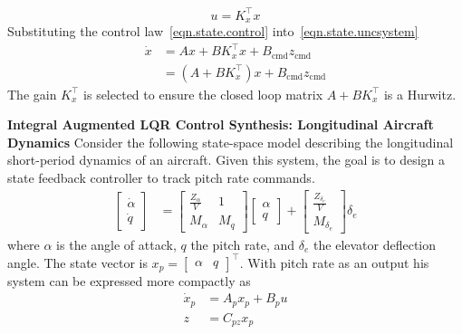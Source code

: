 \begin{equation}
  \label{eqn.state.control}
  u=K_{x}^{\top}x
\end{equation}
Substituting the control law~\eqref{eqn.state.control} into~\eqref{eqn.state.uncsystem}
\begin{equation*}
  \begin{split}
    \dot{x}&=Ax+BK_{x}^{\top}x+B_{\text{cmd}}z_{\text{cmd}} \\
    &=\left(A+BK_{x}^{\top}\right)x+B_{\text{cmd}}z_{\text{cmd}}
  \end{split}
\end{equation*}
The gain $K_{x}^{\top}$ is selected to ensure the closed loop matrix $A+BK_{x}^{\top}$ is a Hurwitz.

\begin{example}
  \textbf{Integral Augmented LQR Control Synthesis: Longitudinal Aircraft Dynamics}
  Consider the following state-space model describing the longitudinal short-period dynamics of an aircraft.
  Given this system, the goal is to design a state feedback controller to track pitch rate commands.
  \begin{align*}
    \begin{bmatrix}
      \dot{\alpha} \\
      \dot{q}
    \end{bmatrix}&=
    \begin{bmatrix}
      \frac{Z_{\alpha}}{V} & 1 \\
      M_{\alpha} & M_{q}
    \end{bmatrix}
    \begin{bmatrix}
      \alpha \\
      q
    \end{bmatrix}+
    \begin{bmatrix}
      \frac{Z_{\delta_{e}}}{V} \\
      M_{\delta_{e}}
    \end{bmatrix}\delta_{e}
  \end{align*}
  where $\alpha$ is the angle of attack, $q$ the pitch rate, and $\delta_{e}$ the elevator deflection angle.
  The state vector is $x_{p}=\begin{bmatrix} \alpha & q \end{bmatrix}^{\top}$.
  With pitch rate as an output his system can be expressed more compactly as
  \begin{align*}
    \dot{x}_{p}&=A_{p}x_{p}+B_{p}u \\
    z&=C_{pz}x_{p}
  \end{align*}

\end{example}
